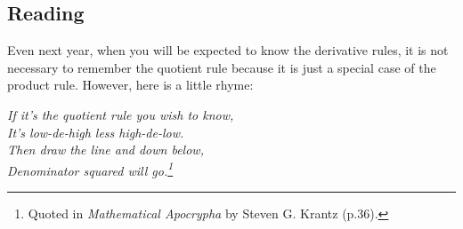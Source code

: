 


\subsection*{Reading}
Even next year, when you will be expected to know the derivative rules, it is not necessary to remember the quotient rule because
it is just a special case of the product rule. However, here is a little rhyme:

\begin{center}\itshape
  If it's the quotient rule you wish to know,\\
  It's low-de-high less high-de-low.\\
  Then draw the line and down below,\\
  Denominator squared will go.\footnote{Quoted in \textit{Mathematical Apocrypha} by Steven G. Krantz (p.36).}
\end{center}

